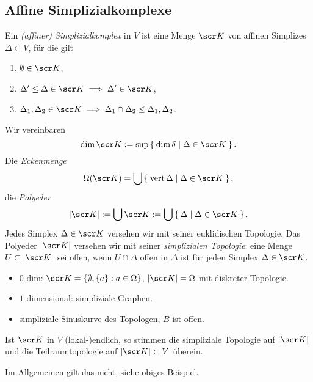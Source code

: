 \subsection{Affine Simplizialkomplexe}



\begin{df}
	Ein \emph{(affiner) Simplizialkomplex} in $V$ ist eine Menge $\scr K$ von affinen Simplizes $\Delta \subset V$, für die gilt
	\begin{enumerate}[1), start=0]
		\item
			$\emptyset \in \scr K$,
		\item
			$\Delta' \le \Delta \in \scr K \implies \Delta' \in \scr K$,
		\item
			$\Delta_1, \Delta_2 \in \scr K \implies \Delta_1 \cap \Delta_2 \le \Delta_1, \Delta_2$.
	\end{enumerate}
	Wir vereinbaren
	\[
		\dim \scr K := \sup \Set{ \dim \delta | \Delta \in \scr K }.
	\]
	Die \emph{Eckenmenge}
	\[
		\Omega(\scr K) = \bigcup \Set{ \vert \Delta | \Delta \in \scr K },
	\]
	die \emph{Polyeder}
	\[
		|\scr K| := \bigcup \scr K := \bigcup \Set{ \Delta | \Delta \in \scr K }.
	\]
	Jedes Simplex $\Delta \in \scr K$ versehen wir mit seiner euklidischen Topologie.
	Das Polyeder $|\scr K|$ versehen wir mit seiner \emph{simplizialen Topologie}:
	eine Menge $U \subset |\scr K|$ sei offen, wenn $U \cap \Delta$ offen in $\Delta$ ist für jeden Simplex $\Delta \in \scr K$.
\end{df}

\begin{ex}[Gegenbeispiele]
\end{ex}

\begin{ex}
	\begin{itemize}
		\item
			$0$-dim: $\scr K = \{ \emptyset, \{a\} : a \in \Omega \}$, $|\scr K| = \Omega$ mit diskreter Topologie.
		\item
			$1$-dimensional: simpliziale Graphen.
		\item
			simpliziale Sinuskurve des Topologen, $B$ ist offen.
	\end{itemize}
\end{ex}

\begin{nt}
	Ist $\scr K$ in $V$ (lokal-)endlich, so stimmen die simpliziale Topologie auf $|\scr K|$ und die Teilraumtopologie auf $|\scr K| \subset V$ überein.

	Im Allgemeinen gilt das nicht, siehe obiges Beispiel.
\end{nt}


